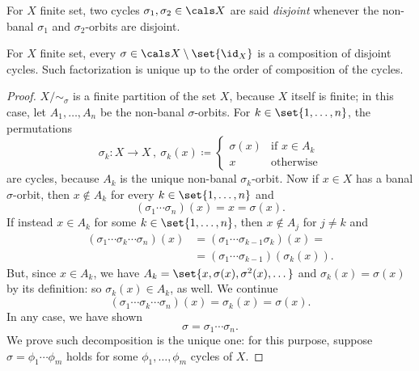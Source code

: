 \begin{definition}
For \(X\) finite set, two cycles \(\sigma_1, \sigma_2 \in \cals X\) are said {\em disjoint} whenever the non-banal \(\sigma_1\) and \(\sigma_2\)-orbits are disjoint.
\end{definition}

\begin{proposition}
For \(X\) finite set, every \(\sigma \in \cals X \setminus \set{\id_X}\) is a composition of disjoint cycles. Such factorization is unique up to the order of composition of the cycles.
\end{proposition}

\begin{proof}
\(X/\sim_\sigma\) is a finite partition of the set \(X\), because \(X\) itself is finite; in this case, let \(A_1, \dots{}, A_n\) be the non-banal \(\sigma\)-orbits. For \(k \in \set{1, \dots{}, n}\), the permutations
\[\sigma_k : X \to X\,, \ \sigma_k(x) \coloneq \begin{cases} \sigma(x) & \text{if } x \in A_k \\ x & \text{otherwise} \end{cases}\]
are cycles, because \(A_k\) is the unique non-banal \(\sigma_k\)-orbit. Now if \(x \in X\) has a banal \(\sigma\)-orbit, then \(x \notin A_k\) for every \(k \in \set{1, \dots{}, n}\) and
\[(\sigma_1 \cdots{} \sigma_n) (x) = x = \sigma(x) .\] If instead \(x \in A_k\) for some \(k \in \set{1, \dots{}, n}\), then \(x \notin A_j\) for \(j \ne k\) and
\begin{align*}
(\sigma_1 \cdots{} \sigma_k \cdots{} \sigma_n)(x) & = (\sigma_1 \cdots{} \sigma_{k-1} \sigma_k) (x) = \\
& = (\sigma_1 \cdots{} \sigma_{k-1})(\sigma_k(x)).
\end{align*}
But, since \(x \in A_k\), we have \(A_k = \set{x, \sigma(x), \sigma^2(x), \dots{}}\) and \(\sigma_k(x) = \sigma(x)\) by its definition: so \(\sigma_k(x) \in A_k\), as well. We continue
\[(\sigma_1 \cdots{} \sigma_k \cdots{} \sigma_n)(x) = \sigma_k(x) = \sigma(x) .\]
In any case, we have shown
\[\sigma = \sigma_1 \cdots{} \sigma_n.\]
We prove such decomposition is the unique one: for this purpose, suppose \(\sigma = \phi_1 \cdots{} \phi_m\) holds for some \(\phi_1, \dots{}, \phi_m\) cycles of \(X\). %
\end{proof}
